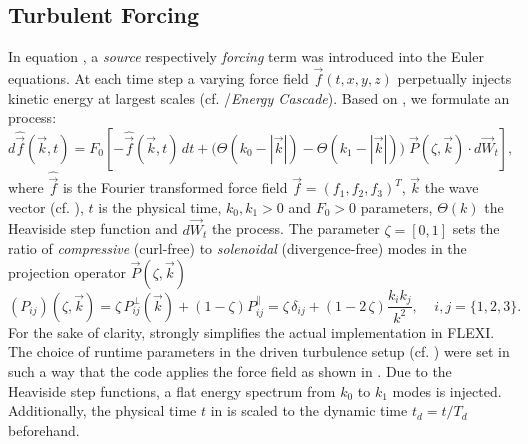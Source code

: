\subsection{Turbulent Forcing}
\label{sec:turbuforcing}



In equation , a \emph{source} respectively
\emph{forcing} term was introduced into the Euler equations. At each time step
a varying force field $\vec{f}(t,x,y,z)$ perpetually injects kinetic energy at
largest scales (cf. /\emph{Energy Cascade}). Based on
\cite{schmidt2009numerical}, we formulate an  process:
\begin{equation}
\label{eqn:ornstein-uhlenbeck}
  d\widehat{\vec{f}}(\vec{k},t) = F_0
        \left[-\hat{\vec{f}}(\vec{k},t)\,dt 
        + \big(\Theta(k_0 - |\vec{k}|) - \Theta(k_1 - |\vec{k}|)\big)\; \vec{P}(\zeta,\vec{k})\cdot d\vec{W}_t \right],
\end{equation}
where $\widehat{\vec{f}}$ is the Fourier transformed force field $\vec{f} =
(f_1,f_2,f_3)^T$, $\vec{k}$ the wave vector (cf.  ),
$t$ is the physical time, $k_0,k_1 > 0$ and $F_0 > 0$ parameters, $\Theta(k)$ the
Heaviside step function and $d\vec{W}_t$ the  process. The
parameter $\zeta = [0,1]$ sets the ratio of \emph{compressive} (curl-free) to
\emph{solenoidal} (divergence-free) modes in the projection operator
$\vec{P}(\zeta,\vec{k})$
\begin{equation}
  (P_{ij})(\zeta,\vec{k}) = \zeta\,P_{ij}^\perp(\vec{k}) + (1-\zeta) P_{ij}^\parallel =\zeta\,\delta_{ij} + (1-2\,\zeta) \frac{k_i k_j}{k^2},\;\;\;\; i,j = \{1,2,3\}.
\end{equation}
For the sake of clarity,  strongly simplifies the
actual implementation in FLEXI. The choice of runtime parameters in the driven
turbulence setup (cf. ) were set in such a way that the code
applies the force field as shown in .  Due to the
Heaviside step functions, a flat energy spectrum from $k_0$ to $k_1$ modes is
injected. Additionally, the physical time $t$ in  is
scaled to the dynamic time $t_d = t/T_d$ beforehand.

